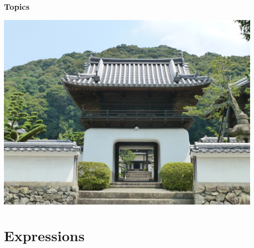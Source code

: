 \documentclass{beamer}
\begin{document}
\begin{frame}
  \PresentationTitleSlide
\end{frame}

\begin{frame}
 \frametitle{Topics}
 \tableofcontents
\end{frame}


\begin{frame}
\begin{center}
\includegraphics[scale=0.35]
	{figures/jpg/pic01.jpg}
\end{center}
\end{frame}
\section{Expressions}
\end{document}
